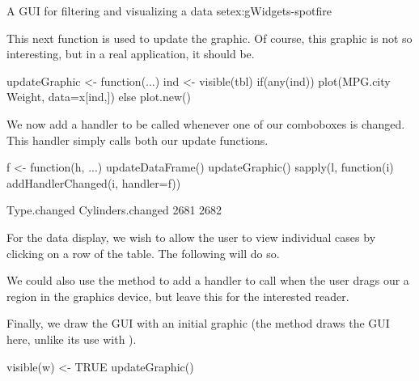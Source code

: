 \begin{example}{A GUI for filtering and visualizing a data set}{ex:gWidgets-spotfire}

This next function is used to update the graphic. Of course, this graphic is not
so interesting, but in a real application, it should be.
\begin{Schunk}
\begin{Sinput}
 updateGraphic <- function(...) {
   ind <- visible(tbl)
   if(any(ind))
     plot(MPG.city ~ Weight, data=x[ind,])
   else
     plot.new()
 }
\end{Sinput}
\end{Schunk}

We now add a handler to be called whenever one of our comboboxes is
changed. This handler simply calls both our update functions.
\begin{Schunk}
\begin{Sinput}
 f <- function(h, ...) {
   updateDataFrame()
   updateGraphic()
 }
 sapply(l, function(i) addHandlerChanged(i, handler=f))
\end{Sinput}
\begin{Soutput}
     Type.changed Cylinders.changed 
             2681              2682 
\end{Soutput}
\end{Schunk}
%
For the data display, we wish to allow the user to view individual cases
by clicking on a row of the table. The following will do so.

\begin{Schunk}
\end{Schunk}
%
We could also use the  method to
add a handler to call when the user drags our a region in the graphics
device, but leave this for the interested reader.


Finally, we draw the GUI with an initial graphic (the
 method draws the GUI here, unlike its use
with ).
\begin{Schunk}
\begin{Sinput}
 visible(w) <- TRUE
 updateGraphic()
\end{Sinput}
\end{Schunk}
\end{example}

